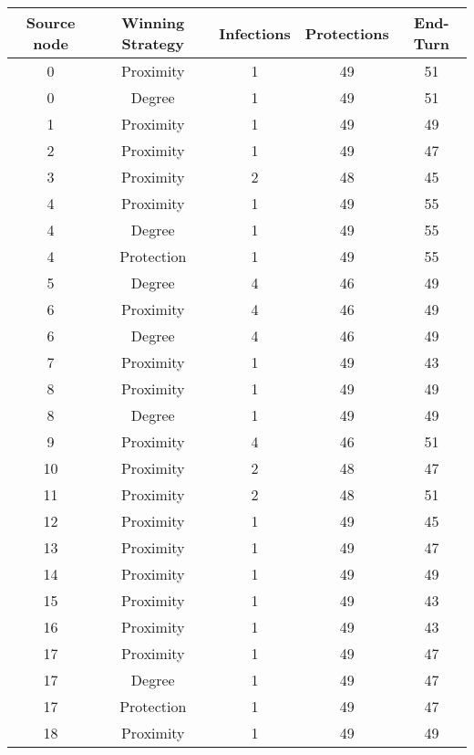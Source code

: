 \documentclass[results.tex]{subfiles}
\begin{document}
\begin{center}
  \begin{tabular}{| c || c | c | c | c |}
    \hline
    {\bfseries Source node} & {\bfseries Winning Strategy} & {\bfseries Infections} & {\bfseries Protections} & {\bfseries End-Turn} \\  %
    \hline\hline
    0 & Proximity & 1 & 49 & 51 \\ 
    \hline
    0 & Degree & 1 & 49 & 51 \\ 
    \hline
    1 & Proximity & 1 & 49 & 49 \\ 
    \hline
    2 & Proximity & 1 & 49 & 47 \\ 
    \hline
    3 & Proximity & 2 & 48 & 45 \\ 
    \hline
    4 & Proximity & 1 & 49 & 55 \\ 
    \hline
    4 & Degree & 1 & 49 & 55 \\ 
    \hline
    4 & Protection & 1 & 49 & 55 \\ 
    \hline
    5 & Degree & 4 & 46 & 49 \\ 
    \hline
    6 & Proximity & 4 & 46 & 49 \\ 
    \hline
    6 & Degree & 4 & 46 & 49 \\ 
    \hline
    7 & Proximity & 1 & 49 & 43 \\ 
    \hline
    8 & Proximity & 1 & 49 & 49 \\ 
    \hline
    8 & Degree & 1 & 49 & 49 \\ 
    \hline
    9 & Proximity & 4 & 46 & 51 \\ 
    \hline
    10 & Proximity & 2 & 48 & 47 \\ 
    \hline
    11 & Proximity & 2 & 48 & 51 \\ 
    \hline
    12 & Proximity & 1 & 49 & 45 \\ 
    \hline
    13 & Proximity & 1 & 49 & 47 \\ 
    \hline
    14 & Proximity & 1 & 49 & 49 \\ 
    \hline
    15 & Proximity & 1 & 49 & 43 \\ 
    \hline
    16 & Proximity & 1 & 49 & 43 \\ 
    \hline
    17 & Proximity & 1 & 49 & 47 \\ 
    \hline
    17 & Degree & 1 & 49 & 47 \\ 
    \hline
    17 & Protection & 1 & 49 & 47 \\ 
    \hline
    18 & Proximity & 1 & 49 & 49 \\ 
    \hline

\end{tabular}
\end{center}
\end{document}
